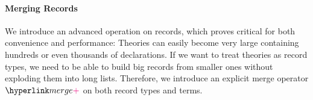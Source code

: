 %				
%				

\paragraph{Merging Records}\label{sec:merging}

We introduce an advanced operation on records, which proves critical for both convenience and performance:
Theories can easily become very large containing hundreds or even thousands of declarations.
If we want to treat theories as record types, we need to be able to build big records from smaller ones without exploding them into long lists.
Therefore, we introduce an explicit merge operator $\recmergesym$ on both record types and terms.

